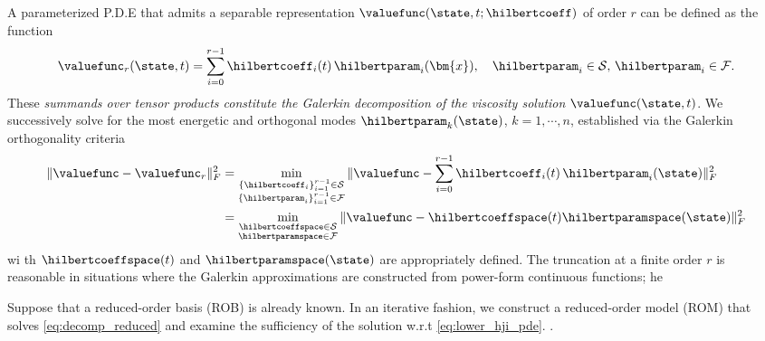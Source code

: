 A parameterized P.D.E that admits a separable representation $\valuefunc(\state, t; \hilbertcoeff)$ of order $r$ can be defined as the function
%
\begin{align}
	\valuefunc_r(\state, t) = \sum_{i=0}^{r-1}  \hilbertcoeff_i(t) \, \hilbertparam_i(\bm{x}), \quad \hilbertparam_i \in   \mathcal{S}, \, \hilbertparam_i \in \mathcal{F}.
	\label{eq:decomp_reduced}
\end{align} 
% 
These \textit{summands over tensor products constitute the Galerkin decomposition of the viscosity solution} $\valuefunc (\state,t)$. %
We successively solve for the most energetic and orthogonal modes $\hilbertparam_k(\state)$, $k=1, \cdots, n$, established  via the Galerkin orthogonality criteria 
%
\begin{align}
	\| \valuefunc - \valuefunc_r \|^2_{F} &= \min_{\substack{\{\hilbertcoeff_i\}_{i=1}^{r-1} \in \mathcal{S} \\ \{\hilbertparam_i\}_{i=1}^{r-1} \in \mathcal{F} }} \|\valuefunc - \sum_{i=0}^{r-1}  \hilbertcoeff_i(t)\, \hilbertparam_i(\state) \|_F^2 \\
	&=\min_{\substack{\hilbertcoeffspace \in \mathcal{S} \\ \hilbertparamspace \in \mathcal{F} }} \|\valuefunc - \hilbertcoeffspace(t) \hilbertparamspace(\state) \|_F^2
	\label{eq:galerk_orth_crit_reduced}
\end{align}
%
wi th $\hilbertcoeffspace(t)$ and $\hilbertparamspace(\state)$ are appropriately defined. The truncation at a finite order $r$ is reasonable in situations where the Galerkin approximations are constructed from power-form continuous functions; he

Suppose that a reduced-order basis (ROB) is already known. In an iterative fashion, we construct a reduced-order model (ROM) that solves \eqref{eq:decomp_reduced} and examine the sufficiency of the solution w.r.t \eqref{eq:lower_hji_pde}. .

